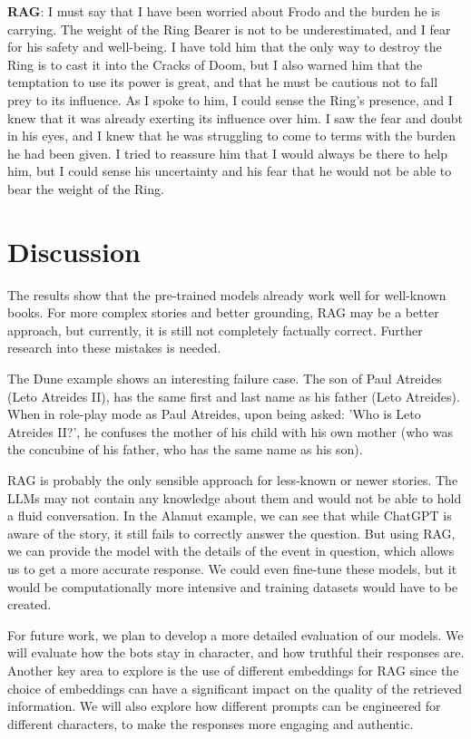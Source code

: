 \documentclass[fleqn,moreauthors,10pt]{ds_report}
\begin{document}
\begin{strip}
\begin{tcolorbox}
\textbf{RAG}: I must say that I have been worried about Frodo and the burden he is carrying. The weight of the Ring Bearer is not to be underestimated, and I fear for his safety and well-being. I have told him that the only way to destroy the Ring is to cast it into the Cracks of Doom, but I also warned him that the temptation to use its power is great, and that he must be cautious not to fall prey to its influence.
As I spoke to him, I could sense the Ring's presence, and I knew that it was already exerting its influence over him. I saw the fear and doubt in his eyes, and I knew that he was struggling to come to terms with the burden he had been given. I tried to reassure him that I would always be there to help him, but I could sense his uncertainty and his fear that he would not be able to bear the weight of the Ring.
\end{tcolorbox}

\end{strip}

\section*{Discussion}

The results show that the pre-trained models already work well for well-known books. For
more complex stories and better grounding, RAG may be a better approach, but currently,
it is still not completely factually correct. Further research into these mistakes is
needed.

The Dune example shows an interesting failure case. The son of Paul Atreides (Leto Atreides II), has the same first and last name as his father (Leto Atreides). When in role-play mode as Paul Atreides, upon being asked: 'Who is Leto Atreides II?', he confuses the mother of his child with his own mother (who was the concubine of his father, who has the same name as his son).

RAG is probably the only sensible approach for less-known or newer stories. The LLMs may not contain any knowledge about them and would not be able to hold a fluid conversation. In the Alamut example, we can see that while ChatGPT is aware of the story, it still fails to correctly answer the question. But using RAG, we can provide the model with the details of
the event in question, which allows us to get a more accurate response. We could even
fine-tune these models, but it would be computationally more intensive and training 
datasets would have to be created. 

For future work, we plan to develop a more detailed evaluation of our models. We will
evaluate how the bots stay in character, and how truthful their responses are. Another
key area to explore is the use of different embeddings for RAG since the choice of
embeddings can have a significant impact on the quality of the retrieved information.
We will also explore how different prompts can be engineered for different characters,
to make the responses more engaging and authentic. 




\end{document}
